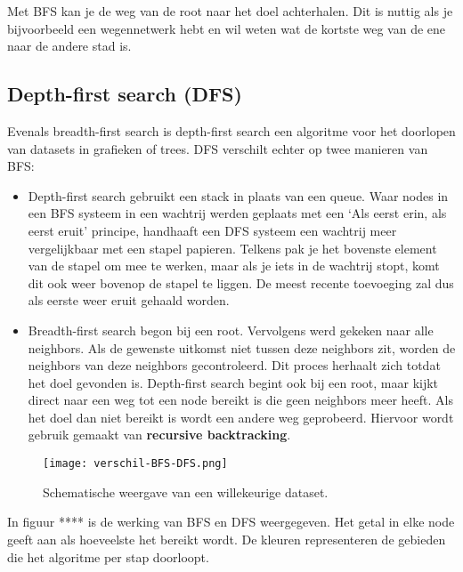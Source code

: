 Met BFS kan je de weg van de root naar het doel achterhalen. Dit is nuttig als je bijvoorbeeld een wegennetwerk hebt en wil weten wat de kortste weg van de ene naar de andere stad is.


\subsection{Depth-first search (DFS)}
Evenals breadth-first search is depth-first search een algoritme voor het doorlopen van datasets in grafieken of trees. DFS verschilt echter op twee manieren van BFS:

\begin{itemize}
\item Depth-first search gebruikt een stack in plaats van een queue. Waar nodes in een BFS systeem in een wachtrij werden geplaats met een `Als eerst erin, als eerst eruit' principe, handhaaft een DFS systeem een wachtrij meer vergelijkbaar met een stapel papieren. Telkens pak je het bovenste element van de stapel om mee te werken, maar als je iets in de wachtrij stopt, komt dit ook weer bovenop de stapel te liggen. De meest recente toevoeging zal dus als eerste weer eruit gehaald worden.
\item Breadth-first search begon bij een root. Vervolgens werd gekeken naar alle neighbors. Als de gewenste uitkomst niet tussen deze neighbors zit, worden de neighbors van deze neighbors gecontroleerd. Dit proces herhaalt zich totdat het doel gevonden is.
Depth-first search begint ook bij een root, maar kijkt direct naar een weg tot een node bereikt is die geen neighbors meer heeft. Als het doel dan niet bereikt is wordt een andere weg geprobeerd. Hiervoor wordt gebruik gemaakt van \textbf{recursive backtracking}.

\end{itemize}

\begin{figure}[h]
  \centering
    \texttt{[image: verschil-BFS-DFS.png]}
  \caption{Schematische weergave van een willekeurige dataset.}
  \label{fig:verschil-BFS-DFS}
\end{figure}

In figuur ****  is de werking van BFS en DFS weergegeven. Het getal in elke node geeft aan als hoeveelste het bereikt wordt. De kleuren representeren de gebieden die het algoritme per stap doorloopt.

